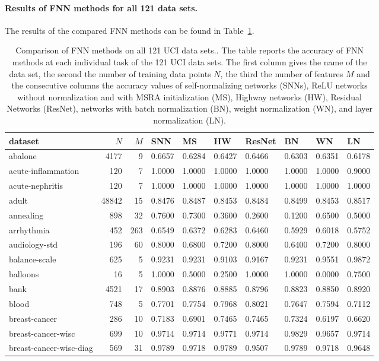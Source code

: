 \documentclass{article}
\begin{document}
\paragraph{Results of FNN methods for all 121 data sets.}
The results of the compared FNN methods can be found in Table~\ref{tab:UCIfull}.

\begin{table}
\caption[Comparison of FNN methods on all 121 UCI data sets.]{Comparison of FNN methods on all 121 UCI data sets.. The table reports the accuracy of FNN methods at each individual 
task of the 121 UCI data sets. The first column gives the name of the data set, the second the number
of training data points $N$, the third the number of features $M$ and the consecutive columns the accuracy values of
self-normalizing networks (SNNs), ReLU networks without normalization and with MSRA initialization (MS),
Highway networks (HW), Residual Networks (ResNet), networks with batch normalization (BN), weight 
normalization (WN), and layer normalization (LN). \label{tab:UCIfull}}
\footnotesize
\begin{tabular}{lrrlllllll}
\toprule
dataset & $N$ & $M$ & SNN & MS & HW & ResNet & BN & WN & LN\tabularnewline
\midrule
abalone & 4177 & 9 & 0.6657 & 0.6284 & 0.6427 & 0.6466 & 0.6303 & 0.6351 & 0.6178\tabularnewline
acute-inflammation & 120 & 7 & 1.0000 & 1.0000 & 1.0000 & 1.0000 & 1.0000 & 1.0000 & 0.9000\tabularnewline
acute-nephritis & 120 & 7 & 1.0000 & 1.0000 & 1.0000 & 1.0000 & 1.0000 & 1.0000 & 1.0000\tabularnewline
adult & 48842 & 15 & 0.8476 & 0.8487 & 0.8453 & 0.8484 & 0.8499 & 0.8453 & 0.8517\tabularnewline
annealing & 898 & 32 & 0.7600 & 0.7300 & 0.3600 & 0.2600 & 0.1200 & 0.6500 & 0.5000\tabularnewline
arrhythmia & 452 & 263 & 0.6549 & 0.6372 & 0.6283 & 0.6460 & 0.5929 & 0.6018 & 0.5752\tabularnewline
audiology-std & 196 & 60 & 0.8000 & 0.6800 & 0.7200 & 0.8000 & 0.6400 & 0.7200 & 0.8000\tabularnewline
balance-scale & 625 & 5 & 0.9231 & 0.9231 & 0.9103 & 0.9167 & 0.9231 & 0.9551 & 0.9872\tabularnewline
balloons & 16 & 5 & 1.0000 & 0.5000 & 0.2500 & 1.0000 & 1.0000 & 0.0000 & 0.7500\tabularnewline
bank & 4521 & 17 & 0.8903 & 0.8876 & 0.8885 & 0.8796 & 0.8823 & 0.8850 & 0.8920\tabularnewline
blood & 748 & 5 & 0.7701 & 0.7754 & 0.7968 & 0.8021 & 0.7647 & 0.7594 & 0.7112\tabularnewline
breast-cancer & 286 & 10 & 0.7183 & 0.6901 & 0.7465 & 0.7465 & 0.7324 & 0.6197 & 0.6620\tabularnewline
breast-cancer-wisc & 699 & 10 & 0.9714 & 0.9714 & 0.9771 & 0.9714 & 0.9829 & 0.9657 & 0.9714\tabularnewline
breast-cancer-wisc-diag & 569 & 31 & 0.9789 & 0.9718 & 0.9789 & 0.9507 & 0.9789 & 0.9718 & 0.9648\tabularnewline

\end{tabular}
\end{table}
\end{document}
